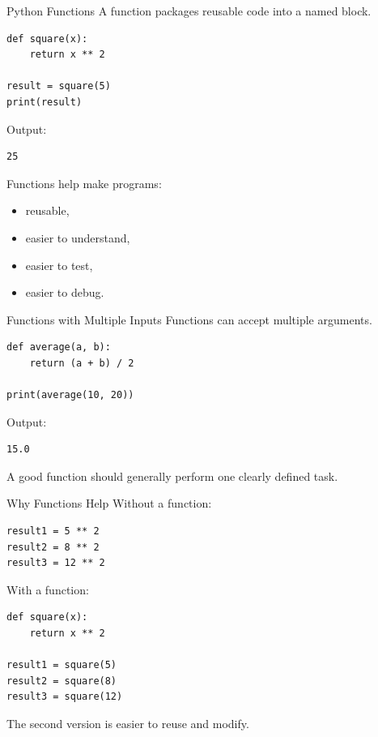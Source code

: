 \documentclass[aspectratio=169]{beamer}
\begin{document}
\begin{frame}[fragile]{Python Functions}
A function packages reusable code into a named block.

\begin{lstlisting}
def square(x):
    return x ** 2

result = square(5)
print(result)
\end{lstlisting}

Output:
\begin{verbatim}
25
\end{verbatim}

Functions help make programs:
\begin{itemize}
    \item reusable,
    \item easier to understand,
    \item easier to test,
    \item easier to debug.
\end{itemize}
\end{frame}

\begin{frame}[fragile]{Functions with Multiple Inputs}
Functions can accept multiple arguments.

\begin{lstlisting}
def average(a, b):
    return (a + b) / 2

print(average(10, 20))
\end{lstlisting}

Output:
\begin{verbatim}
15.0
\end{verbatim}

\vspace{0.2cm}

A good function should generally perform one clearly defined task.
\end{frame}

\begin{frame}[fragile]{Why Functions Help}
Without a function:

\begin{lstlisting}
result1 = 5 ** 2
result2 = 8 ** 2
result3 = 12 ** 2
\end{lstlisting}

With a function:

\begin{lstlisting}
def square(x):
    return x ** 2

result1 = square(5)
result2 = square(8)
result3 = square(12)
\end{lstlisting}

The second version is easier to reuse and modify.
\end{frame}
\end{document}
